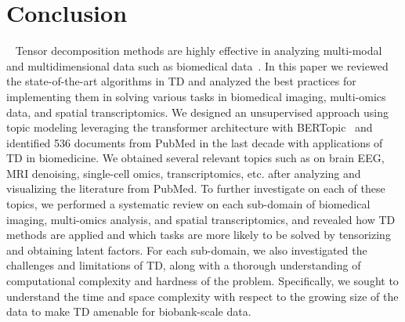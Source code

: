 \section{Conclusion}~\label{sec:conclusion}
Tensor decomposition methods are highly effective in analyzing multi-modal and multidimensional data such as biomedical data~\cite{cichocki2016tensor}. In this paper we reviewed the state-of-the-art algorithms in TD and analyzed the best practices for implementing them in solving various tasks in biomedical imaging, multi-omics data, and spatial transcriptomics. We designed an unsupervised approach using topic modeling leveraging the transformer architecture with BERTopic~\cite{grootendorst2022bertopic} and identified 536 documents from PubMed in the last decade with applications of TD in biomedicine. We obtained several relevant topics such as on brain EEG, MRI denoising, single-cell omics, transcriptomics, etc. after analyzing and visualizing the literature from PubMed. To further investigate on each of these topics, we performed a systematic review on each sub-domain of biomedical imaging, multi-omics analysis, and spatial transcriptomics, and revealed how TD methods are applied and which tasks are more likely to be solved by tensorizing and obtaining latent factors. For each sub-domain, we also investigated the challenges and limitations of TD, along with a thorough understanding of computational complexity and hardness of the problem. Specifically, we sought to understand the time and space complexity with respect to the growing size of the data to make TD amenable for biobank-scale data. 


